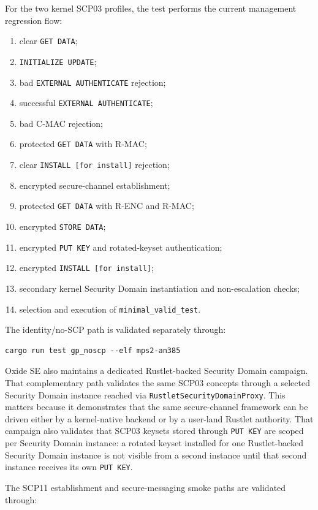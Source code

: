 For the two kernel SCP03 profiles, the test performs the current management
regression flow:
\begin{enumerate}
\item clear \texttt{GET DATA};
\item \texttt{INITIALIZE UPDATE};
\item bad \texttt{EXTERNAL AUTHENTICATE} rejection;
\item successful \texttt{EXTERNAL AUTHENTICATE};
\item bad C-MAC rejection;
\item protected \texttt{GET DATA} with R-MAC;
\item clear \texttt{INSTALL [for install]} rejection;
\item encrypted secure-channel establishment;
\item protected \texttt{GET DATA} with R-ENC and R-MAC;
\item encrypted \texttt{STORE DATA};
\item encrypted \texttt{PUT KEY} and rotated-keyset authentication;
\item encrypted \texttt{INSTALL [for install]};
\item secondary kernel Security Domain instantiation and non-escalation checks;
\item selection and execution of \texttt{minimal\_valid\_test}.
\end{enumerate}

The identity/no-SCP path is validated separately through:

\begin{verbatim}
cargo run test gp_noscp --elf mps2-an385
\end{verbatim}

Oxide SE also maintains a dedicated Rustlet-backed Security Domain campaign.
That complementary path validates the same SCP03 concepts through a selected
Security Domain instance reached via \texttt{RustletSecurityDomainProxy}. This
matters because it demonstrates that the same secure-channel framework can be
driven either by a kernel-native backend or by a user-land Rustlet authority.
That campaign also validates that SCP03 keysets stored through
\texttt{PUT KEY} are scoped per Security Domain instance: a rotated keyset
installed for one Rustlet-backed Security Domain instance is not visible from a
second instance until that second instance receives its own \texttt{PUT KEY}.

The SCP11 establishment and secure-messaging smoke paths are validated through:

